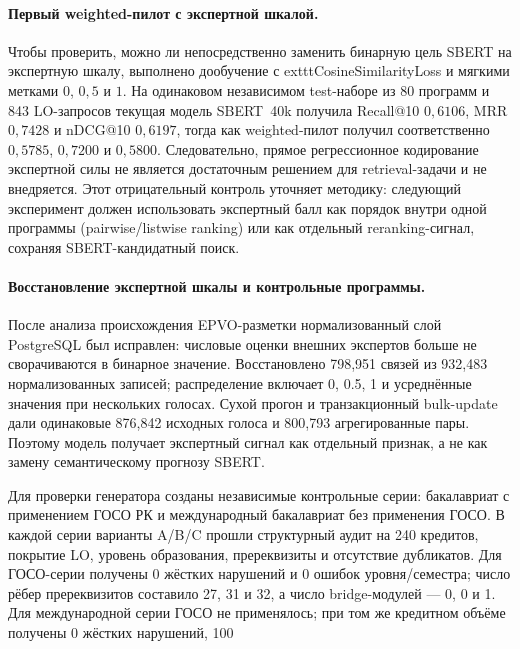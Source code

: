 \documentclass[twoside,11pt]{article}
\begin{document}
\paragraph{Первый weighted-пилот с экспертной шкалой.}
Чтобы проверить, можно ли непосредственно заменить бинарную цель SBERT на экспертную шкалу, выполнено дообучение с 	exttt{CosineSimilarityLoss} и мягкими метками $0$, $0{,}5$ и $1$. На одинаковом независимом test-наборе из 80 программ и 843 LO-запросов текущая модель SBERT~40k получила Recall@10 $0{,}6106$, MRR $0{,}7428$ и nDCG@10 $0{,}6197$, тогда как weighted-пилот получил соответственно $0{,}5785$, $0{,}7200$ и $0{,}5800$. Следовательно, прямое регрессионное кодирование экспертной силы не является достаточным решением для retrieval-задачи и не внедряется. Этот отрицательный контроль уточняет методику: следующий эксперимент должен использовать экспертный балл как порядок внутри одной программы (pairwise/listwise ranking) или как отдельный reranking-сигнал, сохраняя SBERT-кандидатный поиск.

\paragraph{Восстановление экспертной шкалы и контрольные программы.}
После анализа происхождения EPVO-разметки нормализованный слой PostgreSQL был исправлен: числовые оценки внешних экспертов больше не сворачиваются в бинарное значение. Восстановлено 798,951 связей из 932,483 нормализованных записей; распределение включает 0, 0.5, 1 и усреднённые значения при нескольких голосах. Сухой прогон и транзакционный bulk-update дали одинаковые 876,842 исходных голоса и 800,793 агрегированные пары. Поэтому модель получает экспертный сигнал как отдельный признак, а не как замену семантическому прогнозу SBERT.

Для проверки генератора созданы независимые контрольные серии: бакалавриат с применением ГОСО РК и международный бакалавриат без применения ГОСО. В каждой серии варианты A/B/C прошли структурный аудит на 240 кредитов, покрытие LO, уровень образования, пререквизиты и отсутствие дубликатов. Для ГОСО-серии получены 0 жёстких нарушений и 0 ошибок уровня/семестра; число рёбер пререквизитов составило 27, 31 и 32, а число bridge-модулей --- 0, 0 и 1. Для международной серии ГОСО не применялось; при том же кредитном объёме получены 0 жёстких нарушений, 100%
\end{document}
